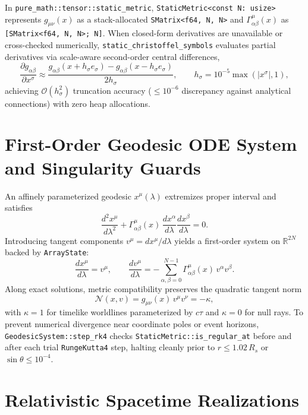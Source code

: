 \documentclass[12pt]{article}
\begin{document}
In \texttt{pure\_math::tensor::static\_metric}, \texttt{StaticMetric<const N: usize>} represents $g_{\mu\nu}(x)$ as a stack-allocated \texttt{SMatrix<f64, N, N>} and $\Gamma^\mu_{\alpha\beta}(x)$ as \texttt{[SMatrix<f64, N, N>; N]}. When closed-form derivatives are unavailable or cross-checked numerically, \texttt{static\_christoffel\_symbols} evaluates partial derivatives via scale-aware second-order central differences,
\begin{equation}
\frac{\partial g_{\alpha\beta}}{\partial x^\sigma} \approx
\frac{g_{\alpha\beta}(x + h_\sigma e_\sigma) - g_{\alpha\beta}(x - h_\sigma e_\sigma)}{2 h_\sigma},
\qquad h_\sigma = 10^{-5} \max(|x^\sigma|, 1),
\end{equation}
achieving $\mathcal{O}(h_\sigma^2)$ truncation accuracy ($\le 10^{-6}$ discrepancy against analytical connections) with zero heap allocations.

\section{First-Order Geodesic ODE System and Singularity Guards}

An affinely parameterized geodesic $x^\mu(\lambda)$ extremizes proper interval and satisfies
\begin{equation}
\frac{d^2 x^\mu}{d\lambda^2} + \Gamma^\mu_{\alpha\beta}(x)\, \frac{dx^\alpha}{d\lambda}\frac{dx^\beta}{d\lambda} = 0.
\end{equation}
Introducing tangent components $v^\mu = dx^\mu / d\lambda$ yields a first-order system on $\mathbb{R}^{2N}$ backed by \texttt{ArrayState}:
\begin{equation}
\frac{dx^\mu}{d\lambda} = v^\mu, \qquad
\frac{dv^\mu}{d\lambda} = -\sum_{\alpha,\beta=0}^{N-1} \Gamma^\mu_{\alpha\beta}(x)\, v^\alpha v^\beta.
\end{equation}
Along exact solutions, metric compatibility preserves the quadratic tangent norm
\begin{equation}
\mathcal{N}(x, v) = g_{\mu\nu}(x)\, v^\mu v^\nu = -\kappa,
\end{equation}
with $\kappa = 1$ for timelike worldlines parameterized by $c\tau$ and $\kappa = 0$ for null rays. To prevent numerical divergence near coordinate poles or event horizons, \texttt{GeodesicSystem::step\_rk4} checks \texttt{StaticMetric::is\_regular\_at} before and after each trial \texttt{RungeKutta4} step, halting cleanly prior to $r \le 1.02\,R_s$ or $\sin\theta \le 10^{-4}$.

\section{Relativistic Spacetime Realizations}
\end{document}
